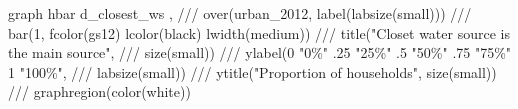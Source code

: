 graph hbar d_closest_ws , ///
over(urban_2012, label(labsize(small))) ///
bar(1, fcolor(gs12) lcolor(black) lwidth(medium)) ///
title("Closet water source is the main source", ///
          size(small)) ///      
ylabel(0 "0\%" .25 "25\%" .5 "50\%" .75 "75\%" 1 "100\%", ///
          labsize(small)) ///
ytitle("Proportion of households", size(small)) ///
graphregion(color(white))                               
